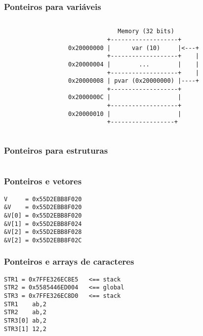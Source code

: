 \documentclass{beamer}
\begin{document}
\begin{frame}[fragile]
	\frametitle{Ponteiros para variáveis}
	\begin{columns}[T] %
	\begin{column}{.50\textwidth}
		
	\end{column}%
	\hfill%
	\begin{column}{.50\textwidth}
	 {\tiny
	\begin{verbatim}
              Memory (32 bits)
           +-------------------+
0x20000000 |      var (10)     |<---+
           +-------------------+    |
0x20000004 |        ...        |    |
           +-------------------+    |
0x20000008 | pvar (0x20000000) |----+
           +-------------------+
0x2000000C |                   |
           +-------------------+
0x20000010 |                   |
           +------------------+
	\end{verbatim}
}
	\end{column}%
\end{columns}
\end{frame}

\begin{frame}[fragile]
	\frametitle{Ponteiros para estruturas}
	\begin{columns}[T] %
	\begin{column}{.75\textwidth}
		
	\end{column}%
	\hfill%
	\begin{column}{.25\textwidth}
	\end{column}%
\end{columns}
\end{frame}

\begin{frame}[fragile]
	\frametitle{Ponteiros e vetores}
		
	 {\scriptsize
	 	\begin{verbatim}
V     = 0x55D2EBB8F020
&V    = 0x55D2EBB8F020
&V[0] = 0x55D2EBB8F020
&V[1] = 0x55D2EBB8F024
&V[2] = 0x55D2EBB8F028
&V[2] = 0x55D2EBB8F02C
	\end{verbatim}
	}
\end{frame}

\begin{frame}[fragile]
	\frametitle{Ponteiros e arrays de caracteres}
		
	 {\scriptsize
	 	\begin{verbatim}
STR1 = 0x7FFE326EC8E5   <== stack
STR2 = 0x5585446ED004   <== global
STR3 = 0x7FFE326EC8D0   <== stack
STR1    ab,2
STR2    ab,2
STR3[0] ab,2
STR3[1] 12,2
	\end{verbatim}
	}
\end{frame}
\end{document}
